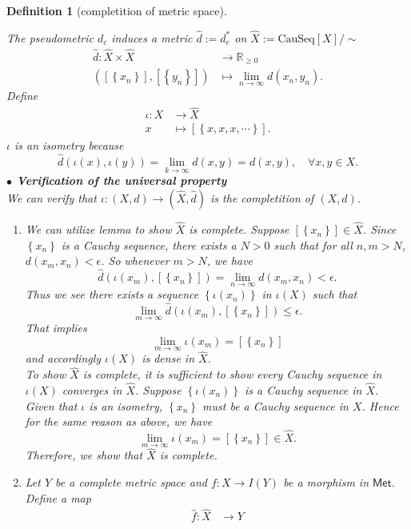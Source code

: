 \documentclass{report}
\newtheorem{definition}{Definition}[section]
\theoremstyle{nonumberplain}
\begin{document}
\begin{definition}[completition of metric space]
\begin{enumerate}
	\end{enumerate}
	The pseudometric $d_c$ induces a metric $\hat{d}:=d_c^*$ on $\hat{X}:=\mathrm{CauSeq}[X]/\sim$
	\begin{align*}
		\hat{d}:\hat{X}\times\hat{X}&\longrightarrow\mathbb{R}_{\ge 0}\\
		\left([\left\{x_n\right\}],[\left\{y_n\right\}]\right)&\longmapsto\lim_{n\to\infty}d(x_n,y_n).
	\end{align*}
	Define 
	\begin{align*}
		\iota:X &\longrightarrow\hat{X}\\
		x&\longmapsto[\left\{x,x,x,\cdots\right\}].
	\end{align*}
	$\iota$ is an isometry because
	\[
		\hat{d}\left(\iota\left(x\right),\iota\left(y\right)\right)=\lim_{k\to\infty}d(x,y)=d(x,y),\quad\forall x,y\in X.
	\]
	\textbf{$\bullet$ Verification of the universal property}\\
	We can verify that $\iota:(X,d)\to\left(\hat{X},\hat{d}\right)$ is the completition of $(X,d)$. 
	\begin{enumerate}[label=(\roman*)]
		\item We can utilize lemma to show $\hat{X}$ is complete. Suppose $\left[\left\{x_n\right\}\right]\in \hat{X}$. Since $\left\{x_n\right\}$ is a Cauchy sequence, there exists a $N>0$ such that for all $n,m>N$, $d(x_m,x_n)<\epsilon$. So whenever $m>N$, we have
	\[
		\hat{d}\left(\iota\left(x_m\right),[\left\{x_n\right\}]\right)=\lim_{n\to\infty}d(x_m,x_n)<\epsilon.
	\]
	Thus we see there exists a sequence $\left\{\iota(x_n)\right\}$ in $\iota(X)$ such that 
	\[
		\lim_{m\to \infty}\hat{d}\left(\iota\left(x_m\right),[\left\{x_n\right\}]\right)\le \epsilon.
	\]
	That implies 
	\[
		\lim_{m\to \infty}\iota\left(x_m\right)= [\left\{x_n\right\}]
	\]
	and accordingly $\iota\left(X\right)$ is dense in $\hat{X}$.\\
	To show $\hat{X}$ is complete, it is sufficient to show every Cauchy sequence in $\iota(X)$ converges in $\hat{X}$. Suppose $\left\{\iota(x_n)\right\}$ is a Cauchy sequence in $\hat{X}$. Given that $\iota$ is an isometry, $\left\{x_n\right\}$ must be a Cauchy sequence in $X$. Hence for the same reason as above, we have
	\[
		\lim_{m\to \infty}\iota\left(x_m\right)= [\left\{x_n\right\}]\in \hat{X}.
	\]
	Therefore, we show that $\hat{X}$ is complete.
	\item Let $Y$ be a complete metric space and $f:X\to I(Y)$ be a morphism in $\mathsf{Met}$. Define a map
	\begin{align*}
		\hat{f}:\hat{X}&\longrightarrow Y\\

\end{align*}
\end{enumerate}
\end{definition}
\end{document}
